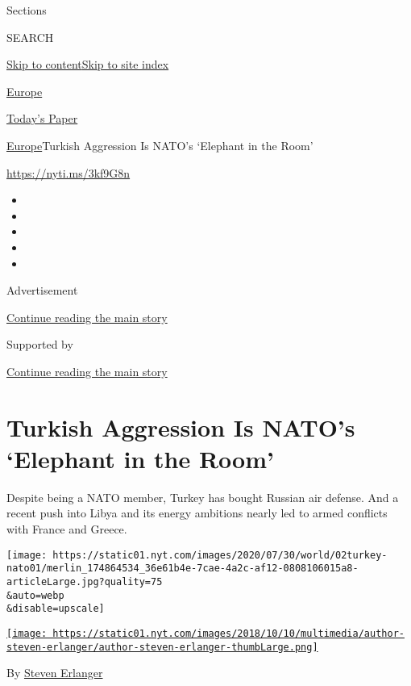 Sections

SEARCH

\protect\hyperlink{site-content}{Skip to
content}\protect\hyperlink{site-index}{Skip to site index}

\href{https://www.nytimes.com/section/world/europe}{Europe}

\href{https://myaccount.nytimes.com/auth/login?response_type=cookie\&client_id=vi}{}

\href{https://www.nytimes.com/section/todayspaper}{Today's Paper}

\href{/section/world/europe}{Europe}\textbar{}Turkish Aggression Is
NATO's `Elephant in the Room'

\url{https://nyti.ms/3kf9G8n}

\begin{itemize}
\item
\item
\item
\item
\item
\end{itemize}

Advertisement

\protect\hyperlink{after-top}{Continue reading the main story}

Supported by

\protect\hyperlink{after-sponsor}{Continue reading the main story}

\hypertarget{turkish-aggression-is-natos-elephant-in-the-room}{%
\section{Turkish Aggression Is NATO's `Elephant in the
Room'}\label{turkish-aggression-is-natos-elephant-in-the-room}}

Despite being a NATO member, Turkey has bought Russian air defense. And
a recent push into Libya and its energy ambitions nearly led to armed
conflicts with France and Greece.

\texttt{[image: https://static01.nyt.com/images/2020/07/30/world/02turkey-nato01/merlin\_174864534\_36e61b4e-7cae-4a2c-af12-0808106015a8-articleLarge.jpg?quality=75\\\&auto=webp\\\&disable=upscale]}

\href{https://www.nytimes.com/by/steven-erlanger}{\texttt{[image: https://static01.nyt.com/images/2018/10/10/multimedia/author-steven-erlanger/author-steven-erlanger-thumbLarge.png]}}

By \href{https://www.nytimes.com/by/steven-erlanger}{Steven Erlanger}

